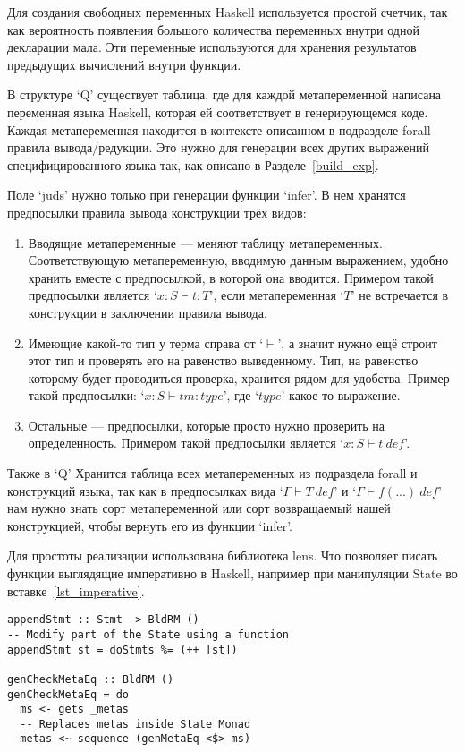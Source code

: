 Для создания свободных переменных Haskell используется простой счетчик, так как вероятность появления большого количества переменных внутри одной декларации мала. Эти переменные используются для хранения результатов предыдущих вычислений внутри функции.

В структуре `Q' существует таблица, где для каждой метапеременной написана переменная языка Haskell, которая ей соответствует в генерирующемся коде. Каждая метапеременная находится в контексте описанном в подразделе forall правила вывода/редукции. Это нужно для генерации всех других выражений специфицированного языка так, как описано в Разделе~\ref{build_exp}.

Поле `juds' нужно только при генерации функции `infer'. В нем хранятся предпосылки правила вывода конструкции трёх видов:
\begin{enumerate}
  \item Вводящие метапеременные --- меняют таблицу метапеременных. Соответствующую метапеременную, вводимую данным выражением, удобно хранить вместе с предпосылкой, в которой она вводится. Примером такой предпосылки является `$x : S \vdash t : T$', если метапеременная `$T$' не встречается в конструкции в заключении правила вывода.
  \item Имеющие какой-то тип у терма справа от `$\vdash$', а значит нужно ещё строит этот тип и проверять его на равенство выведенному. Тип, на равенство которому будет проводиться проверка, хранится рядом для удобства. Пример такой предпосылки: `$x : S \vdash tm : type$', где `$type$' какое-то выражение.
  \item Остальные --- предпосылки, которые просто нужно проверить на определенность. Примером такой предпосылки является `$x : S \vdash t\ def$'.
\end{enumerate}

Также в `Q' Хранится таблица всех метапеременных из подраздела forall и конструкций языка, так как в предпосылках вида `$\Gamma \vdash T\ def$' и `$\Gamma \vdash f(...)\ def$' нам нужно знать сорт метапеременной или сорт возвращаемый нашей конструкцией, чтобы вернуть его из функции `infer'.

Для простоты реализации использована библиотека lens\cite{lens}. Что позволяет писать функции выглядящие императивно в Haskell, например при манипуляции State во вставке~\ref{lst_imperative}.

\begin{lstlisting}[caption={Примеры ``императивного'' кода внутри монады State c использованием библиотеки lens},captionpos=b,frame=single, float, floatplacement=H, label={lst_imperative}]
appendStmt :: Stmt -> BldRM ()
-- Modify part of the State using a function
appendStmt st = doStmts %= (++ [st])

genCheckMetaEq :: BldRM ()
genCheckMetaEq = do
  ms <- gets _metas
  -- Replaces metas inside State Monad
  metas <~ sequence (genMetaEq <$> ms)
\end{lstlisting}

